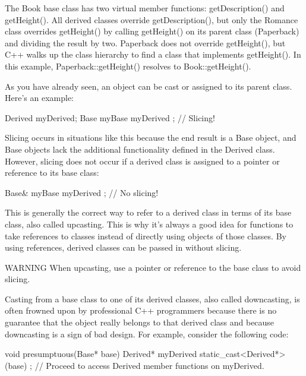 The Book base class has two virtual member functions: getDescription() and getHeight(). All derived classes override getDescription(), but only the Romance class overrides getHeight() by calling getHeight() on its parent class (Paperback) and dividing the result by two. Paperback does not override getHeight(), but C++ walks up the class hierarchy to find a class that implements getHeight(). In this example, Paperback::getHeight() resolves to Book::getHeight().


As you have already seen, an object can be cast or assigned to its parent class. Here’s an example:

\begin{cpp}
Derived myDerived;
Base myBase { myDerived }; // Slicing!
\end{cpp}

Slicing occurs in situations like this because the end result is a Base object, and Base objects lack the additional functionality defined in the Derived class. However, slicing does not occur if a derived class is assigned to a pointer or reference to its base class:

\begin{cpp}
Base& myBase { myDerived }; // No slicing!
\end{cpp}

This is generally the correct way to refer to a derived class in terms of its base class, also called upcasting. This is why it’s always a good idea for functions to take references to classes instead of directly using objects of those classes. By using references, derived classes can be passed in without slicing.

\begin{myWarning}{WARNING}
When upcasting, use a pointer or reference to the base class to avoid slicing.
\end{myWarning}

Casting from a base class to one of its derived classes, also called downcasting, is often frowned upon by professional C++ programmers because there is no guarantee that the object really belongs to that derived class and because downcasting is a sign of bad design. For example, consider the following code:

\begin{cpp}
void presumptuous(Base* base)
{
    Derived* myDerived { static_cast<Derived*>(base) };
    // Proceed to access Derived member functions on myDerived.
}
\end{cpp}

